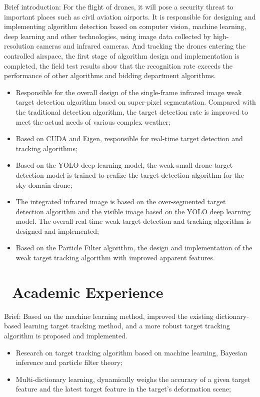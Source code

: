 \documentclass{resume}
\begin{document}
Brief introduction: For the flight of drones, it will pose a security threat to important places such as civil aviation airports. It is responsible for designing and implementing algorithm detection based on computer vision, machine learning, deep learning and other technologies, using image data collected by high-resolution cameras and infrared cameras. And tracking the drones entering the controlled airspace, the first stage of algorithm design and implementation is completed, the field test results show that the recognition rate exceeds the performance of other algorithms and bidding department algorithms.

\begin{itemize}
  \item Responsible for the overall design of the single-frame infrared image weak target detection algorithm based on super-pixel segmentation. Compared with the traditional detection algorithm, the target detection rate is improved to meet the actual needs of various complex weather;
  \item Based on CUDA and Eigen, responsible for real-time target detection and tracking algorithms;
  \item Based on the YOLO deep learning model, the weak small drone target detection model is trained to realize the target detection algorithm for the sky domain drone;
  \item The integrated infrared image is based on the over-segmented target detection algorithm and the visible image based on the YOLO deep learning model. The overall real-time weak target detection and tracking algorithm is designed and implemented;
  \item Based on the Particle Filter algorithm, the design and implementation of the weak target tracking algorithm with improved apparent features.
\end{itemize}

\section{\faUsers\ Academic Experience}
Brief: Based on the machine learning method, improved the existing dictionary-based learning target tracking method, and a more robust target tracking algorithm is proposed and implemented.
\begin{itemize}
  \item Research on target tracking algorithm based on machine learning, Bayesian inference and particle filter theory;
  \item Multi-dictionary learning, dynamically weighs the accuracy of a given target feature and the latest target feature in the target's deformation scene;
\end{itemize}
\end{document}
